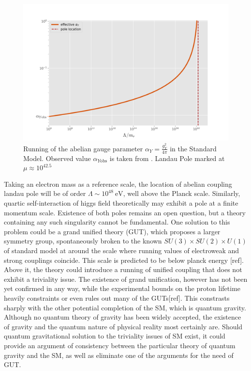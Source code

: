 \documentclass[11pt, a4paper]{article}
\begin{document}
\begin{figure}[H]
    \includegraphics[width=1\textwidth]{./figures/plotr.jpg}
    \caption{Running of the abelian gauge parameter $\alpha_Y = \frac{g_Y^2}{4\pi}$ in the Standard Model. Observed value $\alpha_{Y\text{obs}}$ is taken from \cite{pdg}. 
    Landau Pole marked at $\mu \approx 10^{42.5}$}
    \label{boxes}
\end{figure} 
Taking an electron mass as a reference scale, the location of abelian coupling landau pole will be of order $\Lambda \sim 10^{48} \ \text{eV}$, well above the Planck scale.
Similarly, quartic self-interaction of higgs field theoretically may exhibit a pole at a finite momentum scale.
Existence of both poles remains an open question, but a theory containing any such singularity cannot be fundamental.
One solution to this problem could be a grand unified theory (GUT), which proposes a larger symmetry group, spontaneously broken
to the known $SU(3)\times SU(2) \times U(1)$ of standard model at around the scale where running values of electroweak and strong couplings
coincide. This scale is predicted to be below planck energy [ref]. Above it, the theory could introduce
a running of unified coupling that does not exhibit a triviality issue.
The existence of grand unification, however has not been yet confirmed in any way, while the experimental bounds on the proton lifetime
heavily constraints or even rules out many of the GUTs[ref]. This constrasts sharply with the other potential completion of the SM,
which is quantum gravity. Although no quantum theory of gravity has been widely accepted, the existence of gravity and
the quantum nature of physical reality most certainly are. Should quantum gravitational solution to the triviality issues of SM exist,
it could provide an argument of consistency between the particular theory of quantum gravity and the SM, as well as eliminate one of the arguments for the need of GUT.
\end{document}
